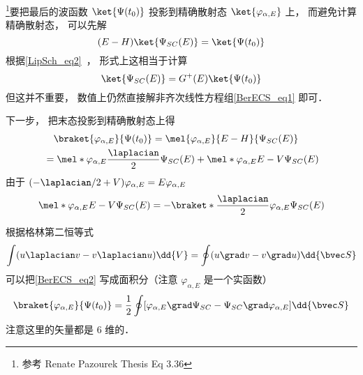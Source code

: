 
\footnote{参考 Renate Pazourek Thesis Eq 3.36}要把最后的波函数 $\ket{\Psi(t_0)}$ 投影到精确散射态 $\ket{\varphi_{\alpha,E}}$ 上， 而避免计算精确散射态， 可以先解
\begin{equation}\label{BerECS_eq1}
(E-H)\ket{\Psi_{SC}(E)} = \ket{\Psi(t_0)}
\end{equation}
根据\autoref{LipSch_eq2}~， 形式上这相当于计算
\begin{equation}
\ket{\Psi_{SC}(E)} = G^+(E)\ket{\Psi(t_0)}
\end{equation}
但这并不重要， 数值上仍然直接解非齐次线性方程组\autoref{BerECS_eq1} 即可．

下一步， 把末态投影到精确散射态上得
\begin{equation}\label{BerECS_eq2}
\begin{aligned}
&\quad \braket{\varphi_{\alpha,E}}{\Psi(t_0)} = \mel{\varphi_{\alpha,E}}{E-H}{\Psi_{SC}(E)}\\
&= \mel*{\varphi_{\alpha,E}}{\frac{\laplacian}{2}}{\Psi_{SC}(E)} + \mel*{\varphi_{\alpha,E}}{E-V}{\Psi_{SC}(E)}
\end{aligned}
\end{equation}
由于 $(-\laplacian/2+V)\varphi_{\alpha,E} = E\varphi_{\alpha,E}$
\begin{equation}
\mel*{\varphi_{\alpha,E}}{E-V}{\Psi_{SC}(E)} = -\braket*{\frac{\laplacian}{2} \varphi_{\alpha,E}}{\Psi_{SC}(E)}
\end{equation}

根据格林第二恒等式
\begin{equation}
\int (u\laplacian v - v\laplacian u)\dd{V} = \oint (u\grad v - v\grad u) \dd{\bvec S}
\end{equation}
可以把\autoref{BerECS_eq2} 写成面积分（注意 $\varphi_{\alpha,E}$ 是一个实函数）
\begin{equation}
\braket{\varphi_{\alpha,E}}{\Psi(t_0)} = \frac{1}{2} \oint [\varphi_{\alpha,E} \grad \Psi_{SC} - \Psi_{SC} \grad \varphi_{\alpha,E}] \dd{\bvec S}
\end{equation}
注意这里的矢量都是 6 维的．

